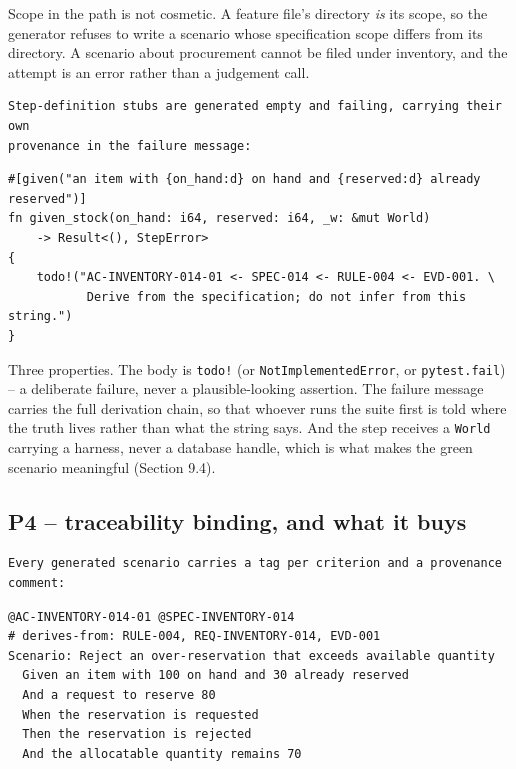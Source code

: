 \documentclass[11pt,a4paper]{article}
\begin{document}
Scope in the path is not cosmetic. A feature file's directory \emph{is} its scope, so the generator refuses to write a scenario whose specification scope differs from its directory. A scenario about procurement cannot be filed under inventory, and the attempt is an error rather than a judgement call.

\begin{Verbatim}[fontsize=\footnotesize,breaklines=true,breakanywhere=true,breakautoindent=false,samepage=false]
Step-definition stubs are generated empty and failing, carrying their own
provenance in the failure message:
\end{Verbatim}

\begin{lstlisting}[style=odcode]
#[given("an item with {on_hand:d} on hand and {reserved:d} already reserved")]
fn given_stock(on_hand: i64, reserved: i64, _w: &mut World)
    -> Result<(), StepError>
{
    todo!("AC-INVENTORY-014-01 <- SPEC-014 <- RULE-004 <- EVD-001. \
           Derive from the specification; do not infer from this string.")
}
\end{lstlisting}

Three properties. The body is \texttt{todo!} (or \texttt{NotImplementedError}, or \texttt{pytest.fail}) -- a deliberate failure, never a plausible-looking assertion. The failure message carries the full derivation chain, so that whoever runs the suite first is told where the truth lives rather than what the string says. And the step receives a \texttt{World} carrying a harness, never a database handle, which is what makes the green scenario meaningful (Section 9.4).

\subsection{P4 -- traceability binding, and what it buys}

\begin{Verbatim}[fontsize=\footnotesize,breaklines=true,breakanywhere=true,breakautoindent=false,samepage=false]
Every generated scenario carries a tag per criterion and a provenance
comment:
\end{Verbatim}

\begin{Verbatim}[fontsize=\footnotesize,breaklines=true,breakanywhere=true,breakautoindent=false,samepage=false]
@AC-INVENTORY-014-01 @SPEC-INVENTORY-014
# derives-from: RULE-004, REQ-INVENTORY-014, EVD-001
Scenario: Reject an over-reservation that exceeds available quantity
  Given an item with 100 on hand and 30 already reserved
  And a request to reserve 80
  When the reservation is requested
  Then the reservation is rejected
  And the allocatable quantity remains 70
\end{Verbatim}
\end{document}
